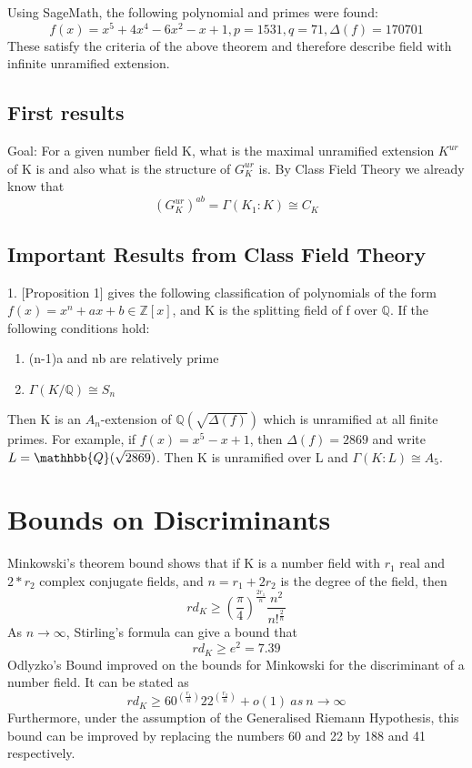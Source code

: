\documentclass[preprint,12pt,leqno]{elsarticle}
\begin{document}
Using SageMath, the following polynomial and primes were found:
\begin{equation}
    f(x) = x^5+4x^4-6x^2-x+1, p=1531,q=71,\Delta(f)=170701
\end{equation}
These satisfy the criteria of the above theorem and therefore describe field with infinite unramified extension. 
\subsection{First results}
Goal: For a given number field K, what is the maximal unramified extension $K^{ur}$ of K is and also what is the structure of $G_K^{ur}$ is. By Class Field Theory we already know that 
\begin{equation}
  (G_K^{ur})^{ab} = \Gamma(K_1:K)\cong C_K
\end{equation}

\subsection{Important Results from Class Field Theory}
1. \cite{YAMA}[Proposition 1] gives the following classification of polynomials of the form $f(x) = x^n+ax+b \in \mathbb{Z}[x]$, and K is the splitting field of f over $\mathbb{Q}$.
\newline
If the following conditions hold:
\begin{enumerate}
    \item (n-1)a and nb are relatively prime 
    \item $\Gamma(K/\mathbb{Q}) \cong S_n$
\end{enumerate}
\newline
Then K is an $A_n$-extension of $\mathbb{Q}(\sqrt{\Delta(f)})$ which is unramified at all finite primes. For example, if $f(x) = x^5-x+1$, then $\Delta(f)= 2869$ and write $L = \mathhbb{Q}(\sqrt{2869})$. Then K is unramified over L and $\Gamma(K:L)\cong A_5.$

\section{Bounds on Discriminants}
Minkowski's theorem bound shows that if K is a number field with $r_1$ real and $2*r_2$ complex conjugate fields, and $n=r_1+2r_2$ is the degree of the field, then 
\begin{equation}
rd_K\geqslant (\frac{\pi}{4})^{\frac{2r_1}{n}}\frac{n^2}{n!^{\frac{2}{n}}}
\end{equation} 
As $n\rightarrow \infty$, Stirling's formula can give a bound that
\begin{equation}
    rd_K\geqslant e^2 = 7.39
\end{equation}
Odlyzko's Bound \cite{ODL2} improved on the bounds for Minkowski for the discriminant of a number field. It can be stated as  
\begin{equation}
rd_K\geqslant 60^{(\frac{r_1}{n})}22^{(\frac{r_2}{n})}+o(1)\:as\:n\rightarrow \infty   
\end{equation}
Furthermore, under the assumption of the Generalised Riemann Hypothesis, 
this bound can be improved by replacing the numbers 60 and 22 by 188 and 41 respectively. 
\end{document}
